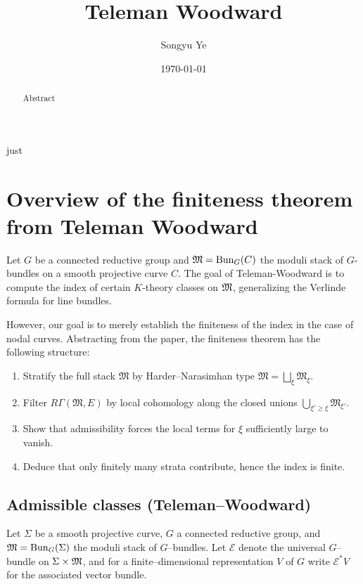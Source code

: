 just \documentclass[12pt]{article}
\begin{document}
\rhead{\today}
\cfoot{\thepage}

\title{Teleman Woodward}

\author{Songyu Ye}
\date{\today}
\maketitle


\begin{abstract}
Abstract
\end{abstract}

\tableofcontents
\section{Overview of the finiteness theorem from Teleman Woodward}
Let $G$ be a connected reductive group and $\mathfrak{M} = \operatorname{Bun}_G(C)$ the moduli stack of $G$-bundles on a smooth projective curve $C$. The goal of Teleman-Woodward is to compute the index of certain $K$-theory classes on $\mathfrak{M}$, generalizing the Verlinde formula for line bundles.

However, our goal is to merely establish the finiteness of the index in the case of nodal curves. Abstracting from the paper, the finiteness theorem has the following structure:
\begin{enumerate}
    \item Stratify the full stack $\mathfrak{M}$ by Harder–Narasimhan type $\mathfrak{M} = \bigsqcup_\xi \mathfrak{M}_\xi$. 
    \item Filter $R\Gamma(\mathfrak{M},E)$ by local cohomology along the closed unions $\bigcup_{\xi' \ge \xi} \mathfrak{M}_{\xi'}$.
    \item Show that admissibility forces the local terms for $\xi$ sufficiently large to vanish.
    \item Deduce that only finitely many strata contribute, hence the index is finite.
\end{enumerate}

\subsection*{Admissible classes (Teleman--Woodward)}

Let $\Sigma$ be a smooth projective curve, $G$ a connected reductive group, and
$\mathfrak{M}=\operatorname{Bun}_G(\Sigma)$ the moduli stack of $G$--bundles.  Let $\mathcal E$ denote
the universal $G$--bundle on $\Sigma\times\mathfrak{M}$, and for a finite--dimensional
representation $V$ of $G$ write $\mathcal E^*V$ for the associated vector bundle.
\end{document}
